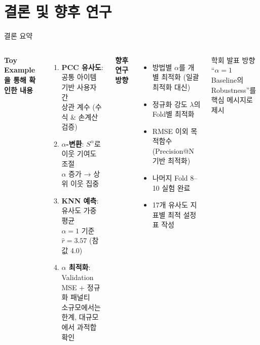 \documentclass[aspectratio=169, 10pt]{beamer}
\begin{document}
\section{결론 및 향후 연구}

\begin{frame}[shrink=5]{결론 요약}

  \begin{columns}[T]
      \textbf{Toy Example을 통해 확인한 내용}
      \begin{enumerate}
        \item \textbf{PCC 유사도}: 공통 아이템 기반 사용자 간\\
              상관 계수 (수식 \& 손계산 검증)
        \item \textbf{$\alpha$-변환}: $S^\alpha$로 이웃 기여도 조절\\
              $\alpha$ 증가 → 상위 이웃 집중
        \item \textbf{KNN 예측}: 유사도 가중 평균\\
              $\alpha=1$ 기준 $\hat{r} = 3.57$ (참값 4.0)
        \item \textbf{$\alpha$ 최적화}: Validation MSE + 정규화 패널티\\
              소규모에서는 한계, 대규모에서 과적합 확인
      \end{enumerate}

      \textbf{향후 연구 방향}
      \begin{itemize}
        \item 방법별 $\alpha$를 개별 최적화 (일괄 최적화 대신)
        \item 정규화 강도 $\lambda$의 Fold별 최적화
        \item RMSE 이외 목적함수 (Precision@N 기반 최적화)
        \item 나머지 Fold 8–10 실험 완료
        \item 17개 유사도 지표별 최적 설정 표 작성
      \end{itemize}
      \vspace{0.4em}
      \begin{alertblock}{학회 발표 방향}
        ``$\alpha=1$ Baseline의 Robustness''를\\
        핵심 메시지로 제시
      \end{alertblock}
  \end{columns}
\end{frame}
\end{document}

